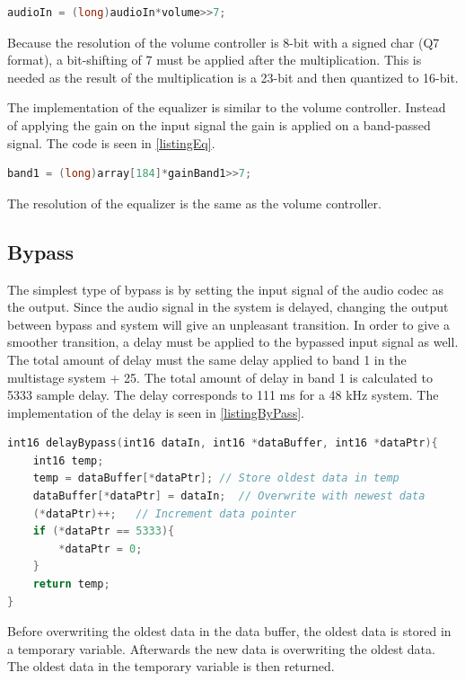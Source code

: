 \begin{lstlisting}[language=C, caption = {Gain adjustment in DSP},label={listingVolume}]
audioIn = (long)audioIn*volume>>7;
\end{lstlisting}

Because the resolution of the volume controller is 8-bit with a signed char (Q7 format), a bit-shifting of 7 must be applied after the multiplication. This is needed as the result of the multiplication is a 23-bit and then quantized to 16-bit.

The implementation of the equalizer is similar to the volume controller. Instead of applying the gain on the input signal the gain is applied on a band-passed signal. The code is seen in \autoref{listingEq}.

\begin{lstlisting}[language=C, caption = {Equalizer Gain adjustment in DSP},label={listingEq}]
band1 = (long)array[184]*gainBand1>>7;
\end{lstlisting}

The resolution of the equalizer is the same as the volume controller. 

\subsection*{Bypass}
The simplest type of bypass is by setting the input signal of the audio codec as the output. Since the audio signal in the system is delayed, changing the output between bypass and system will give an unpleasant transition. In order to give a smoother transition, a delay must be applied to the bypassed input signal as well. The total amount of delay must the same delay applied to band 1 in the multistage system + 25. The total amount of delay in band 1 is calculated to 5333 sample delay. The delay corresponds to 111 ms for a 48 kHz system. The implementation of the delay is seen in \autoref{listingByPass}.

\begin{lstlisting}[language=C, caption = {Delay function for bypass.},label={listingByPass}]
int16 delayBypass(int16 dataIn, int16 *dataBuffer, int16 *dataPtr){
	int16 temp;
	temp = dataBuffer[*dataPtr]; // Store oldest data in temp
	dataBuffer[*dataPtr] = dataIn;	// Overwrite with newest data
	(*dataPtr)++;	// Increment data pointer
	if (*dataPtr == 5333){	
		*dataPtr = 0;	
	}
	return temp;
}
\end{lstlisting}

Before overwriting the oldest data in the data buffer, the oldest data is stored in a temporary variable. Afterwards the new data is overwriting the oldest data. The oldest data in the temporary variable is then returned.

